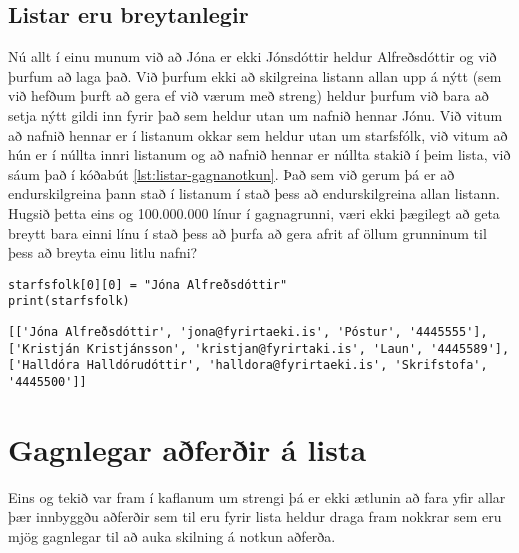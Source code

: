 \subsection{Listar eru breytanlegir}
Nú allt í einu munum við að Jóna er ekki Jónsdóttir heldur Alfreðsdóttir og við þurfum að laga það.
Við þurfum ekki að skilgreina listann allan upp á nýtt (sem við hefðum þurft að gera ef við værum með streng) heldur þurfum við bara að setja nýtt gildi inn fyrir það sem heldur utan um nafnið hennar Jónu.
Við vitum að nafnið hennar er í listanum okkar sem heldur utan um starfsfólk, við vitum að hún er í núllta innri listanum og að nafnið hennar er núllta stakið í þeim lista, við sáum það í kóðabút \ref{lst:listar-gagnanotkun}.
Það sem við gerum þá er að endurskilgreina þann stað í listanum í stað þess að endurskilgreina allan listann.
Hugsið þetta eins og 100.000.000 línur í gagnagrunni, væri ekki þægilegt að geta breytt bara einni línu í stað þess að þurfa að gera afrit af öllum grunninum til þess að breyta einu litlu nafni?

\begin{lstlisting}[caption=Unnið með gögn úr lista, label=lst:listar-gagnabreyting]
starfsfolk[0][0] = "Jóna Alfreðsdóttir"
print(starfsfolk)
\end{lstlisting}
\lstset{style=uttak}
\begin{lstlisting}
[['Jóna Alfreðsdóttir', 'jona@fyrirtaeki.is', 'Póstur', '4445555'], ['Kristján Kristjánsson', 'kristjan@fyrirtaki.is', 'Laun', '4445589'], ['Halldóra Halldórudóttir', 'halldora@fyrirtaeki.is', 'Skrifstofa', '4445500']]
\end{lstlisting}
\lstset{style=venjulegt}

\section{Gagnlegar aðferðir á lista}\label{uk:aðferðir-listar}

Eins og tekið var fram í kaflanum um strengi þá er ekki ætlunin að fara yfir allar þær innbyggðu aðferðir sem til eru fyrir lista heldur draga fram nokkrar sem eru mjög gagnlegar til að auka skilning á notkun aðferða.

